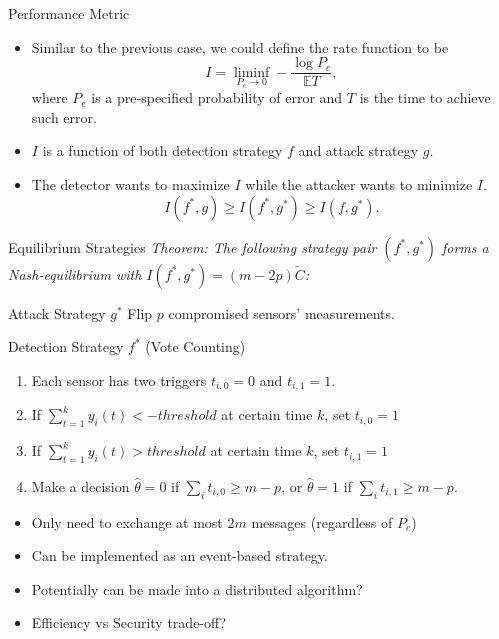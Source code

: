 \documentclass[10pt]{beamer}
\begin{document}
  \begin{frame}{Performance Metric}
    \begin{itemize}
      \item Similar to the previous case, we could define the rate function to be
	\begin{displaymath}
	  I = \liminf_{P_e\rightarrow 0} -\frac{\log P_e}{\mathbb E T},
	\end{displaymath}
	where $P_e$ is a pre-specified probability of error and $T$ is the time to achieve such error.
      \item  $I$ is a function of both detection strategy $f$ and attack strategy $g$.
      \item The detector wants to maximize $I$ while the attacker wants to minimize $I$.
	\begin{displaymath}
	  I(f^*,g)\geq I(f^*,g^*) \geq I(f,g^*).	
	\end{displaymath}
    \end{itemize}  
  \end{frame}

  \begin{frame}{Equilibrium Strategies}
    \emph{Theorem: The following strategy pair $(f^*,g^*)$ forms a Nash-equilibrium with $I(f^*,g^*) = (m-2p)\tilde C$:}
    \begin{block}{Attack Strategy $g^*$}
      Flip $p$ compromised sensors' measurements.
    \end{block}
    \begin{block}{Detection Strategy $f^*$ (Vote Counting)}
      \begin{enumerate}
	\item Each sensor has two triggers $t_{i,0}=0$ and $t_{i,1}=1$.
	\item If $\sum_{t=1}^k y_i(t) < -threshold$ at certain time $k$, set $t_{i,0} = 1$
	\item If $\sum_{t=1}^k y_i(t) > threshold$ at certain time $k$, set $t_{i,1} = 1$
	\item Make a decision $\hat \theta = 0$ if $\sum_i t_{i,0} \geq m-p$, or $\hat \theta = 1$ if $\sum_i t_{i,1} \geq m-p$.
      \end{enumerate}
    \end{block}

    \begin{itemize}
      \item Only need to exchange at most $2m$ messages (regardless of $P_e$)
      \item Can be implemented as an event-based strategy.
      \item Potentially can be made into a distributed algorithm?
      \item Efficiency vs Security trade-off?
    \end{itemize}
  \end{frame}
\end{document}
